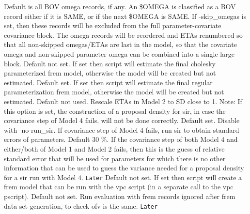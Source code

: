 \begin{optionlist}
{}
Default is all BOV omega records, if any.
An \$OMEGA is classified as a BOV record either if it is SAME, or if the next \$OMEGA is SAME. 
If -skip\_omegas is set,
then these records will be excluded from the full parameter-covariate covariance block.
The omega records will be reordered and ETAs renumbered so that all non-skipped
omegas/ETAs are last in the model, so that the covariate omega and non-skipped parameter omega
can be combined into a single large block.
\nextopt
{}
Default not set.
If set then script will estimate
the final cholesky parameterized frem model, otherwise the model will be
created but not estimated.
\nextopt
{}
Default set.
If set then script will estimate
the final regular parameterization frem model, otherwise the model will be
created but not estimated.
\nextopt
{}
Default not used. Rescale ETAs in Model 2 to SD close to 1.
Note: If this option is set, the construction of a proposal density for sir,
in case the covariance step of Model 4 fails, will not be done correctly.
\nextopt
{}
Default set. Disable with -no-run\_sir. If covariance step of Model 4 fails, run sir
to obtain standard errors of parameters.
\nextopt
{}
Default 30 \%.
If the covariance step of both Model 4 and either/both of Model 1 and Model 2 fails, then
this is the guess of relative standard error that will be used for parameters for which there is no other
information that can be used to guess the variance needed for 
a proposal density for a sir run with Model 4.
\nextopt
{}
{\Large \texttt{Later}}
Default not set. If set then script will create a frem model that can be run with the vpc script (in a separate call to the vpc pscript).  
\nextopt
{}
Default not set. Run evaluation with frem records ignored after frem data set generation, to check ofv is the same.
\nextopt
{}
{\Large \texttt{Later}}

\end{optionlist}
